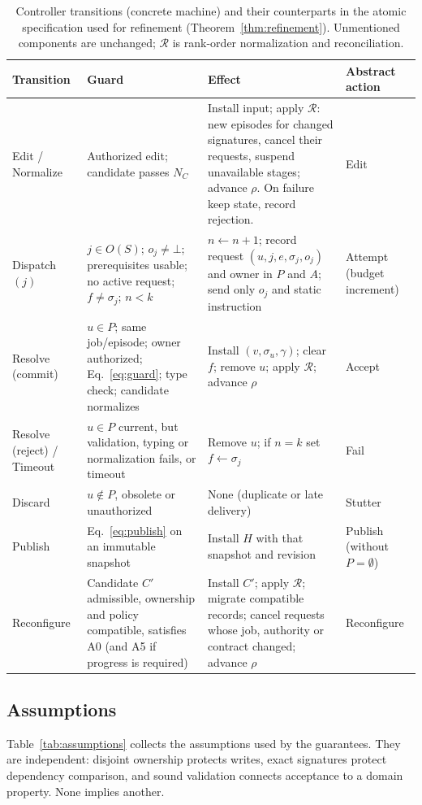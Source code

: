 \documentclass[10pt,journal,compsoc]{IEEEtran}
\theoremstyle{plain}
\theoremstyle{definition}
\newcommand{\Sig}{\sigma}
\newcommand{\nodata}{\bot}
\begin{document}
\begin{table}[!t]
\centering
\caption{Controller transitions (concrete machine) and their counterparts in the atomic specification used for refinement (Theorem~\ref{thm:refinement}). Unmentioned components are unchanged; $\mathcal R$ is rank-order normalization and reconciliation.}\label{tab:rules}
\footnotesize\setlength{\tabcolsep}{4pt}
\begin{tabular}{@{}P{22mm}P{64mm}P{58mm}P{22mm}@{}}\toprule
Transition & Guard & Effect & Abstract action\\\midrule
Edit / Normalize & Authorized edit; candidate passes $N_C$ & Install input; apply $\mathcal R$: new episodes for changed signatures, cancel their requests, suspend unavailable stages; advance $\rho$. On failure keep state, record rejection. & Edit\\
Dispatch$(j)$ & $j\in O(S)$; $o_j\ne\nodata$; prerequisites usable; no active request; $f\ne\Sig_j$; $n<k$ & $n\gets n+1$; record request $(u,j,e,\Sig_j,o_j)$ and owner in $P$ and $A$; send only $o_j$ and static instruction & Attempt (budget increment)\\
Resolve (commit) & $u\in P$; same job/episode; owner authorized; Eq.~\eqref{eq:guard}; type check; candidate normalizes & Install $(v,\Sig_u,\gamma)$; clear $f$; remove $u$; apply $\mathcal R$; advance $\rho$ & Accept\\
Resolve (reject) / Timeout & $u\in P$ current, but validation, typing or normalization fails, or timeout & Remove $u$; if $n=k$ set $f\gets\Sig_j$ & Fail\\
Discard & $u\notin P$, obsolete or unauthorized & None (duplicate or late delivery) & Stutter\\
Publish & Eq.~\eqref{eq:publish} on an immutable snapshot & Install $H$ with that snapshot and revision & Publish (without $P=\emptyset$)\\
Reconfigure & Candidate $C'$ admissible, ownership and policy compatible, satisfies A0 (and A5 if progress is required) & Install $C'$; apply $\mathcal R$; migrate compatible records; cancel requests whose job, authority or contract changed; advance $\rho$ & Reconfigure\\\bottomrule
\end{tabular}
\end{table}

\subsection{Assumptions}
Table~\ref{tab:assumptions} collects the assumptions used by the guarantees. They are independent: disjoint ownership protects writes, exact signatures protect dependency comparison, and sound validation connects acceptance to a domain property. None implies another.
\end{document}
